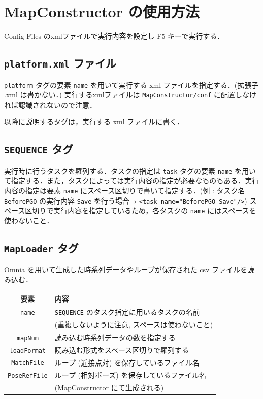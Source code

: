 \documentclass[dvipdfmx]{jsarticle}
\begin{document}
\clearpage
\section{MapConstructor の使用方法}
Config Files のxmlファイルで実行内容を設定し F5 キーで実行する．

\cprotect \subsection{\verb|platform.xml| ファイル}
\verb|platform| タグの要素 \verb|name| を用いて実行する xml ファイルを指定する．(拡張子 .xml は書かない．) 実行するxmlファイルは \verb|MapConstructor/conf| に配置しなければ認識されないので注意．

以降に説明するタグは，実行する xml ファイルに書く．

\cprotect \subsection{\verb|SEQUENCE| タグ}
実行時に行うタスクを羅列する．タスクの指定は \verb|task| タグの要素 \verb|name| を用いて指定する．また，タスクによっては実行内容の指定が必要なものもある．実行内容の指定は要素 \verb|name| にスペース区切りで書いて指定する．(例 : タスク名 \verb|BeforePGO| の実行内容 \verb|Save| を行う場合→ \verb|<task name="BeforePGO Save"/>|) スペース区切りで実行内容を指定しているため，各タスクの \verb|name| にはスペースを使わないこと．

\cprotect \subsection{\verb|MapLoader| タグ}
Omnia を用いて生成した時系列データやループが保存された csv ファイルを読み込む．

\begin{tabular}{c|l}
	\hline
	要素 & 内容 \\
	\hline \hline
	\verb|name| & \verb|SEQUENCE| のタスク指定に用いるタスクの名前 \vspace{-5pt}\\
		& (重複しないように注意, スペースは使わないこと) \\
	\verb|mapNum|  & 読み込む時系列データの数を指定する \\
	\verb|loadFormat|  & 読み込む形式をスペース区切りで羅列する \\
	\verb|MatchFile|  & ループ (近接点対) を保存しているファイル名 \\
	\verb|PoseRefFile|  & ループ (相対ポーズ) を保存しているファイル名 \vspace{-5pt}\\
		& (MapConstructor にて生成される) \\
	\hline
\end{tabular}
\end{document}
